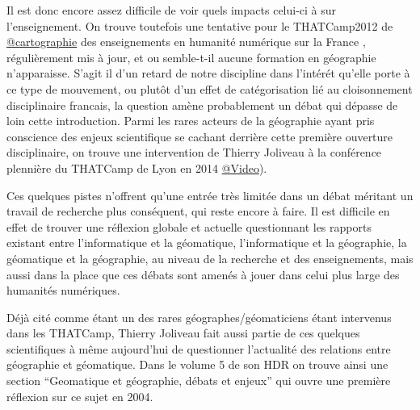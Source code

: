 Il est donc encore assez difficile de voir quels impacts celui-ci à sur l'enseignement. On trouve toutefois une tentative pour le THATCamp2012 de \href{http://pireh.univ-paris1.fr/DHfrancophone/index.php?rem&val=g%C3%A9ographie}{@cartographie} des enseignements en humanité numérique sur la France \autocites{Berra2012b,Clavaud2012}, régulièrement mis à jour, et ou semble-t-il aucune formation en géographie n'apparaisse. S'agit il d'un retard de notre discipline dans l'intérét qu'elle porte à ce type de mouvement, ou plutôt d'un effet de catégorisation lié au cloisonnement disciplinaire francais, la question amène probablement un débat qui dépasse de loin cette introduction. Parmi les rares acteurs de la géographie ayant pris conscience des enjeux scientifique se cachant derrière cette première ouverture disciplinaire, on trouve une intervention de Thierry Joliveau à la conférence plennière du THATCamp de Lyon en 2014 \href{http://dhlyon.hypotheses.org/587}{@Video}).

Ces quelques pistes n'offrent qu'une entrée très limitée dans un débat méritant un travail de recherche plus conséquent, qui reste encore à faire. Il est difficile en effet de trouver une réflexion globale et actuelle questionnant les rapports existant entre l'informatique et la géomatique, l'informatique et la géographie, la géomatique et la géographie, au niveau de la recherche et des enseignements, mais aussi dans la place que ces débats sont amenés à jouer dans celui plus large des humanités numériques.


Déjà cité comme étant un des rares géographes/géomaticiens étant intervenus dans les THATCamp, Thierry Joliveau fait aussi partie de ces quelques scientifiques à même aujourd'hui de questionner l'actualité des relations entre géographie et géomatique. Dans le volume 5 de son HDR on trouve ainsi une section \enquote{Geomatique et géographie, débats et enjeux} qui ouvre une première réflexion sur ce sujet en 2004.

